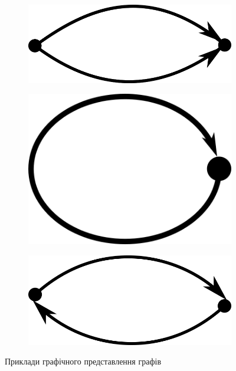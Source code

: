\begin{figure}[!ht]
\begin{subfigure}{.25\textwidth}
    \caption{}
    \label{f:graph_sample_5}
  \end{subfigure}
  \begin{subfigure}{.25\textwidth}
    \centering
    \includegraphics[width=.8\linewidth]{images/lab3/graph_sample_6.png}
    \caption{}
    \label{f:graph_sample_6}
  \end{subfigure}
  \begin{subfigure}{.25\textwidth}
    \centering
    \includegraphics[width=.8\linewidth]{images/lab3/graph_sample_7.png}
    \caption{}
    \label{f:graph_sample_7}
  \end{subfigure}
  \begin{subfigure}{.25\textwidth}
    \centering
    \includegraphics[width=.8\linewidth]{images/lab3/graph_sample_8.png}
    \caption{}
    \label{f:graph_sample_8}
  \end{subfigure}
  \caption{Приклади графічного представлення графів}
  \label{f:graph_examples}
\end{figure}


